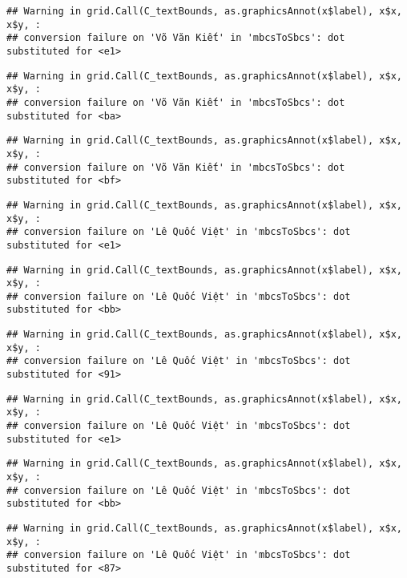 \documentclass[
]{article}
\begin{document}
\begin{verbatim}
## Warning in grid.Call(C_textBounds, as.graphicsAnnot(x$label), x$x, x$y, :
## conversion failure on 'Võ Văn Kiết' in 'mbcsToSbcs': dot substituted for <e1>
\end{verbatim}

\begin{verbatim}
## Warning in grid.Call(C_textBounds, as.graphicsAnnot(x$label), x$x, x$y, :
## conversion failure on 'Võ Văn Kiết' in 'mbcsToSbcs': dot substituted for <ba>
\end{verbatim}

\begin{verbatim}
## Warning in grid.Call(C_textBounds, as.graphicsAnnot(x$label), x$x, x$y, :
## conversion failure on 'Võ Văn Kiết' in 'mbcsToSbcs': dot substituted for <bf>
\end{verbatim}

\begin{verbatim}
## Warning in grid.Call(C_textBounds, as.graphicsAnnot(x$label), x$x, x$y, :
## conversion failure on 'Lê Quốc Việt' in 'mbcsToSbcs': dot substituted for <e1>
\end{verbatim}

\begin{verbatim}
## Warning in grid.Call(C_textBounds, as.graphicsAnnot(x$label), x$x, x$y, :
## conversion failure on 'Lê Quốc Việt' in 'mbcsToSbcs': dot substituted for <bb>
\end{verbatim}

\begin{verbatim}
## Warning in grid.Call(C_textBounds, as.graphicsAnnot(x$label), x$x, x$y, :
## conversion failure on 'Lê Quốc Việt' in 'mbcsToSbcs': dot substituted for <91>
\end{verbatim}

\begin{verbatim}
## Warning in grid.Call(C_textBounds, as.graphicsAnnot(x$label), x$x, x$y, :
## conversion failure on 'Lê Quốc Việt' in 'mbcsToSbcs': dot substituted for <e1>
\end{verbatim}

\begin{verbatim}
## Warning in grid.Call(C_textBounds, as.graphicsAnnot(x$label), x$x, x$y, :
## conversion failure on 'Lê Quốc Việt' in 'mbcsToSbcs': dot substituted for <bb>
\end{verbatim}

\begin{verbatim}
## Warning in grid.Call(C_textBounds, as.graphicsAnnot(x$label), x$x, x$y, :
## conversion failure on 'Lê Quốc Việt' in 'mbcsToSbcs': dot substituted for <87>
\end{verbatim}
\end{document}
